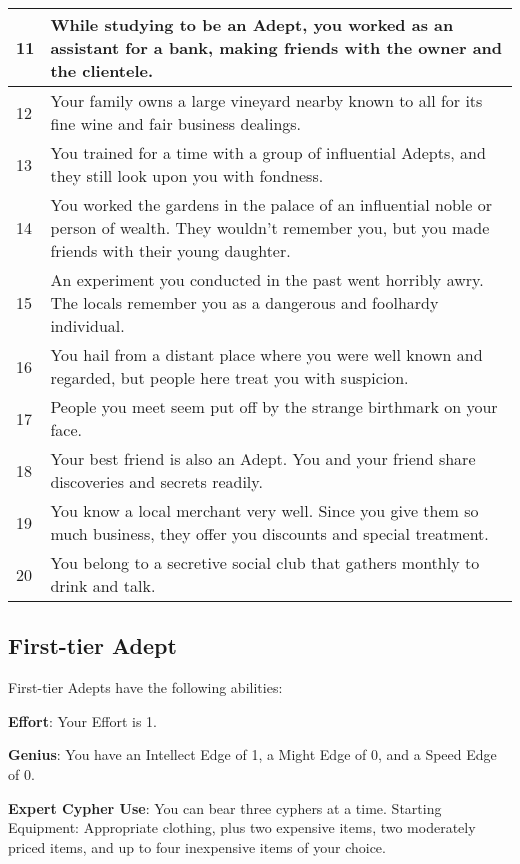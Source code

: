 \begin{table*}
\begin{tabularx}{\textwidth}{| p{} | p{} |}
11 & While studying to be an Adept, you worked as an assistant for a bank, making friends with the owner and the clientele. \\ \hline
12 & Your family owns a large vineyard nearby known to all for its fine wine and fair business dealings. \\ \hline
13 & You trained for a time with a group of influential Adepts, and they still look upon you with fondness. \\ \hline
14 & You worked the gardens in the palace of an influential noble or person of wealth. They wouldn’t remember you, but you made friends with their young daughter. \\ \hline
15 & An experiment you conducted in the past went horribly awry. The locals remember you as a dangerous and foolhardy individual. \\ \hline
16 & You hail from a distant place where you were well known and regarded, but people here treat you with suspicion. \\ \hline
17 & People you meet seem put off by the strange birthmark on your face. \\ \hline
18 & Your best friend is also an Adept. You and your friend share discoveries and secrets readily. \\ \hline
19 & You know a local merchant very well. Since you give them so much business, they offer you discounts and special treatment. \\ \hline
20 & You belong to a secretive social club that gathers monthly to drink and talk. \\ \hline

\end{tabularx}

\end{table*}

\subsection{First-tier Adept}

First-tier Adepts have the following abilities:

\textbf{Effort}: Your Effort is 1. 

\textbf{Genius}: You have an Intellect Edge of 1, a Might Edge of 0, and a Speed Edge of 0. 

\textbf{Expert Cypher Use}: You can bear three cyphers at a time. 
Starting Equipment: Appropriate clothing, plus two expensive items, two moderately priced items, and up to four inexpensive items of your choice.

